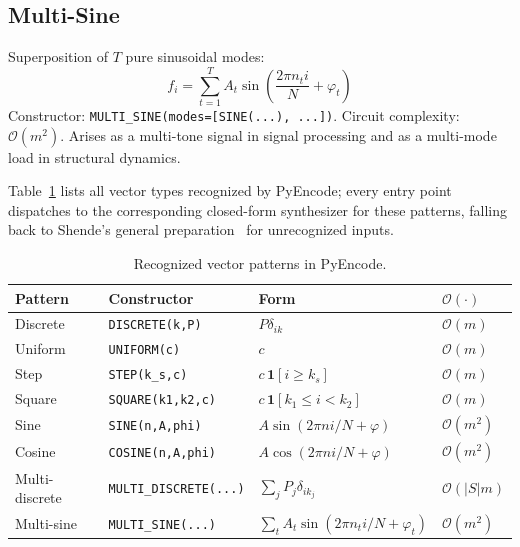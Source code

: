 \documentclass[10pt,twocolumn]{article}
\begin{document}
\subsection*{Multi-Sine}
Superposition of $T$ pure sinusoidal modes:
\[
  f_i = \sum_{t=1}^{T} A_t \sin\!\left(
        \frac{2\pi n_t i}{N} + \varphi_t\right)
\]
Constructor:
\texttt{MULTI\_SINE(modes=[SINE(...), ...])}.
Circuit complexity: $\mathcal{O}(m^2)$.
Arises as a multi-tone signal in signal processing and as
a multi-mode load in structural dynamics.

Table~\ref{tab:patterns} lists all vector types recognized by PyEncode; every entry point dispatches to the corresponding closed-form synthesizer for these patterns, falling back to Shende's general preparation~\cite{shende2006} for unrecognized inputs.

\begin{table}
\centering
\caption{Recognized vector patterns in PyEncode.}
\label{tab:patterns}
\begin{tabular}{llll}
\toprule
\textbf{Pattern} & \textbf{Constructor} &
\textbf{Form} & $\mathcal{O}(\cdot)$ \\
\midrule
Discrete         & \texttt{DISCRETE(k,P)}          & $P\delta_{ik}$                        & $\mathcal{O}(m)$   \\
Uniform          & \texttt{UNIFORM(c)}              & $c$                                   & $\mathcal{O}(m)$   \\
Step             & \texttt{STEP(k\_s,c)}            & $c\,\mathbf{1}[i \geq k_s]$          & $\mathcal{O}(m)$   \\
Square           & \texttt{SQUARE(k1,k2,c)}         & $c\,\mathbf{1}[k_1\leq i<k_2]$       & $\mathcal{O}(m)$   \\
Sine             & \texttt{SINE(n,A,phi)}           & $A\sin(2\pi n i/N+\varphi)$           & $\mathcal{O}(m^2)$ \\
Cosine           & \texttt{COSINE(n,A,phi)}         & $A\cos(2\pi n i/N+\varphi)$           & $\mathcal{O}(m^2)$ \\
Multi-discrete   & \texttt{MULTI\_DISCRETE(...)}    & $\sum_j P_j\delta_{ik_j}$             & $\mathcal{O}(|S|m)$\\
Multi-sine       & \texttt{MULTI\_SINE(...)}        & $\sum_t A_t\sin(2\pi n_t i/N+\varphi_t)$ & $\mathcal{O}(m^2)$ \\
\bottomrule
\end{tabular}
\end{table}
\end{document}
